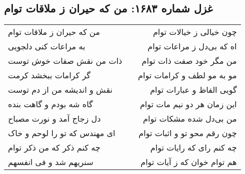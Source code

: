 \begin{center}
\section*{غزل شماره ۱۶۸۳: من که حیران ز ملاقات توام}
\label{sec:1683}
\begin{longtable}{l p{0.5cm} r}
من که حیران ز ملاقات توام
&&
چون خیالی ز خیالات توام
\\
به مراعات کنی دلجویی
&&
اه که بی‌دل ز مراعات توام
\\
ذات من نقش صفات خوش توست
&&
من مگر خود صفت ذات توام
\\
گر کرامات ببخشد کرمت
&&
مو به مو لطف و کرامات توام
\\
نقش و اندیشه من از دم توست
&&
گویی الفاظ و عبارات توام
\\
گاه شه بودم و گاهت بنده
&&
این زمان هر دو نیم مات توام
\\
دل زجاج آمد و نورت مصباح
&&
من بی‌دل شده مشکات توام
\\
ای مهندس که تو را لوحم و خاک
&&
چون رقم محو تو و اثبات توام
\\
چه کنم ذکر که من ذکر توام
&&
چه کنم رای که رایات توام
\\
سنریهم شد و فی انفسهم
&&
هم توام خوان که ز آیات توام
\\
\end{longtable}
\end{center}
